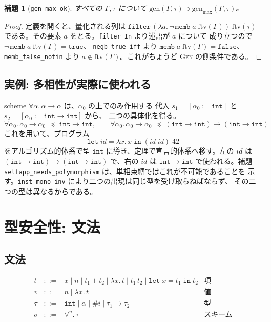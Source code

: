 \documentclass[11pt,a4paper]{ltjsarticle}
\newtheorem{lemma}[theorem]{補題}
\newcommand{\tint}{\mathtt{int}}
\newcommand{\ftv}{\mathrm{ftv}}
\newcommand{\gen}{\mathrm{gen}}
\newcommand{\genmax}{\mathrm{gen}_{\max}}
\newcommand{\inst}{\preceq}
\begin{document}
\begin{lemma}[\texttt{gen\_max\_ok}]
  すべての $\Gamma, \tau$ について $\gen(\Gamma,\tau) \ni \genmax(\Gamma,\tau)$。
\end{lemma}

\begin{proof}
定義を開くと、量化される列は
$\mathtt{filter}\,(\lambda a.\,\neg\,\mathtt{memb}\;a\;\ftv(\Gamma))\;\ftv(\tau)$
である。その要素 $a$ をとる。\texttt{filter\_In} より述語が $a$ について
成り立つので $\neg\,\mathtt{memb}\;a\;\ftv(\Gamma) = \mathtt{true}$、
\texttt{negb\_true\_iff} より $\mathtt{memb}\;a\;\ftv(\Gamma) = \mathtt{false}$、
\texttt{memb\_false\_notin} より $a \notin \ftv(\Gamma)$。これがちょうど
\textsc{Gen} の側条件である。
\end{proof}

\subsection{実例: 多相性が実際に使われる}

scheme $\forall\alpha.\,\alpha \to \alpha$ は、$\alpha_0$ の上でのみ作用する
代入 $s_1 = [\alpha_0 := \tint]$ と $s_2 = [\alpha_0 := \tint \to \tint]$ から、
二つの具体化を得る。
\[
  \forall\alpha_0.\,\alpha_0 \to \alpha_0 \;\inst\; \tint \to \tint,
  \qquad
  \forall\alpha_0.\,\alpha_0 \to \alpha_0 \;\inst\;
  (\tint \to \tint) \to (\tint \to \tint)
\]
これを用いて、プログラム
\[
  \mathtt{let}\;\mathit{id} = \lambda x.\,x\;\mathtt{in}\;
  (\mathit{id}\;\mathit{id})\;42
\]
をアルゴリズム的体系で型 $\tint$ に導き、定理で宣言的体系へ移す。左の
$\mathit{id}$ は $(\tint \to \tint) \to (\tint \to \tint)$ で、右の
$\mathit{id}$ は $\tint \to \tint$ で使われる。補題
\texttt{selfapp\_needs\_polymorphism} は、単相束縛ではこれが不可能であることを
示す。\texttt{inst\_mono\_inv} により二つの出現は同じ型を受け取らねばならず、
その二つの型は異なるからである。

\section{型安全性: 文法}
\label{sec:safe-syntax}

\subsection{文法}

\[
\begin{array}{lcll}
  t & ::= & x \mid n \mid t_1 + t_2 \mid \lambda x.\,t \mid t_1\,t_2
            \mid \mathtt{let}\;x = t_1\;\mathtt{in}\;t_2
    & \text{項}\\[2pt]
  v & ::= & n \mid \lambda x.\,t
    & \text{値}\\[2pt]
  \tau & ::= & \tint \mid \alpha \mid \#i \mid \tau_1 \to \tau_2
    & \text{型}\\[2pt]
  \sigma & ::= & \forall^{n}.\,\tau
    & \text{スキーム}
\end{array}
\]
\end{document}
